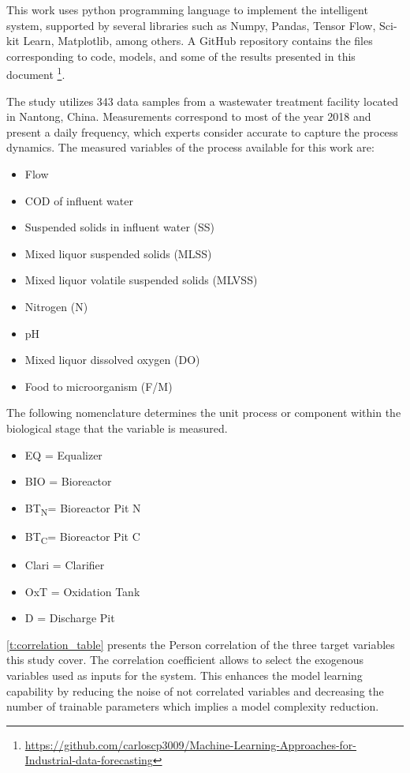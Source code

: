 This work uses python programming language to implement the intelligent system, supported by several libraries such as Numpy, Pandas, Tensor Flow, Sci-kit Learn, Matplotlib, among others. A GitHub repository contains the files corresponding to code, models, and some of the results presented in this document \footnote{\url{https://github.com/carloscp3009/Machine-Learning-Approaches-for-Industrial-data-forecasting}}. 

The study utilizes 343 data samples from a wastewater treatment facility located in Nantong, China. Measurements correspond to most of the year 2018 and present a daily frequency, which experts consider accurate to capture the process dynamics. The measured variables of the process available for this work are:

\begin{itemize}
 \item	Flow
 \item	COD of influent water
 \item	Suspended solids in influent water (SS)
 \item	Mixed liquor suspended solids (MLSS)
 \item	Mixed liquor volatile suspended solids (MLVSS)
 \item	Nitrogen (N)
 \item	pH
 \item	Mixed liquor dissolved oxygen (DO)
 \item	Food to microorganism (F/M)
\end{itemize}

The following nomenclature determines the unit process or component within the biological stage that the variable is measured.

\begin{itemize}
 \item	EQ = Equalizer
 \item	BIO = Bioreactor
 \item	BT\textsubscript{N}= Bioreactor Pit N
 \item	BT\textsubscript{C}= Bioreactor Pit C
 \item	Clari = Clarifier
 \item	OxT = Oxidation Tank
 \item	D = Discharge Pit
\end{itemize}


\autoref{t:correlation_table} presents the Person correlation of the three target variables this study cover. The correlation coefficient allows to select the exogenous variables used as inputs for the system. This enhances the model learning capability by reducing the noise of not correlated variables and decreasing the number of trainable parameters which implies a model complexity reduction. 

